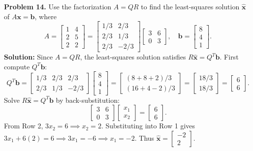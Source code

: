 \documentclass[11pt, letterpaper]{article}
\theoremstyle{definition}
\theoremstyle{remark}
\begin{document}
\textbf{Problem 14.} Use the factorization $A = QR$ to find the least-squares solution $\hat{\mathbf{x}}$ of $A\mathbf{x} = \mathbf{b}$, where
\[
A = \begin{bmatrix} 1 & 4 \\ 2 & 5 \\ 2 & 2 \end{bmatrix} = \begin{bmatrix} 1/3 & 2/3 \\ 2/3 & 1/3 \\ 2/3 & -2/3 \end{bmatrix} \begin{bmatrix} 3 & 6 \\ 0 & 3 \end{bmatrix}, \quad \mathbf{b} = \begin{bmatrix} 8 \\ 4 \\ 1 \end{bmatrix}.
\]
\textbf{Solution:} Since $A = QR$, the least-squares solution satisfies $R\hat{\mathbf{x}} = Q^T \mathbf{b}$. First compute $Q^T \mathbf{b}$:
\[
Q^T \mathbf{b} = \begin{bmatrix} 1/3 & 2/3 & 2/3 \\ 2/3 & 1/3 & -2/3 \end{bmatrix} \begin{bmatrix} 8 \\ 4 \\ 1 \end{bmatrix} = \begin{bmatrix} (8+8+2)/3 \\ (16+4-2)/3 \end{bmatrix} = \begin{bmatrix} 18/3 \\ 18/3 \end{bmatrix} = \begin{bmatrix} 6 \\ 6 \end{bmatrix}.
\]
Solve $R\hat{\mathbf{x}} = Q^T \mathbf{b}$ by back-substitution:
\[
\begin{bmatrix} 3 & 6 \\ 0 & 3 \end{bmatrix} \begin{bmatrix} x_1 \\ x_2 \end{bmatrix} = \begin{bmatrix} 6 \\ 6 \end{bmatrix}.
\]
From Row 2, $3x_2 = 6 \implies x_2 = 2$. Substituting into Row 1 gives $3x_1 + 6(2) = 6 \implies 3x_1 = -6 \implies x_1 = -2$. Thus $\hat{\mathbf{x}} = \begin{bmatrix} -2 \\ 2 \end{bmatrix}$.
\end{document}

